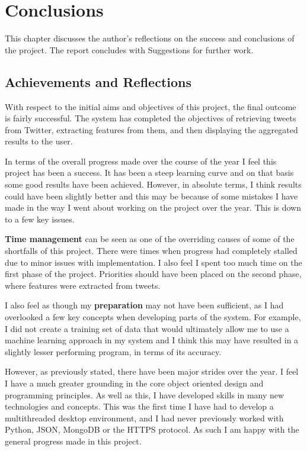 \chapter{Conclusions}
\label{cha:conclusion}
This chapter discusses the author's reflections on the success and conclusions of the project. The report concludes with Suggestions for further work.

\section{Achievements and Reflections}
With respect to the initial aims and objectives of this project, the final outcome is fairly successful. The system has completed the objectives of retrieving tweets from Twitter, extracting features from them, and then displaying the aggregated results to the user.

In terms of the overall progress made over the course of the year I feel this project has been a success. It has been a steep learning curve and on that basis some good results have been achieved. However, in absolute terms, I think results could have been slightly better and this may be because of some mistakes I have made in the way I went about working on the project over the year. This is down to a few key issues.

\textbf{Time management} can be seen as one of the overriding causes of some of the shortfalls of this project. There were times when progress had completely stalled due to minor issues with implementation. I also feel I spent too much time on the first phase of the project. Priorities should have been placed on the second phase, where features were extracted from tweets.

I also feel as though my \textbf{preparation} may not have been sufficient, as I had overlooked a few key concepts when developing parts of the system. For example, I did not create a training set of data that would ultimately allow me to use a machine learning approach in my system and I think this may have resulted in a slightly lesser performing program, in terms of its accuracy.

However, as previously stated, there have been major strides over the year. I feel I have a much greater grounding in the core object oriented design and programming principles. As well as this, I have developed skills in many new technologies and concepts. This was the first time I have had to develop a multithreaded desktop environment, and I had never previously worked with Python, JSON, MongoDB or the HTTPS protocol. As such I am happy with the general progress made in this project.

